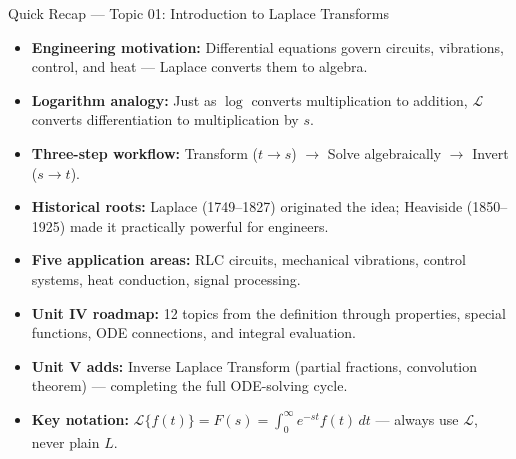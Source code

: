 \documentclass[12pt,a4paper]{article}
\begin{document}
\begin{learnbox}{Quick Recap --- Topic 01: Introduction to Laplace Transforms}
\begin{itemize}[leftmargin=*, itemsep=4pt]
  \item \textbf{Engineering motivation:} Differential equations govern
        circuits, vibrations, control, and heat --- Laplace converts them to
        algebra.
  \item \textbf{Logarithm analogy:} Just as $\log$ converts multiplication to
        addition, $\mathcal{L}$ converts differentiation to multiplication
        by $s$.
  \item \textbf{Three-step workflow:}
        Transform ($t \to s$) $\to$ Solve algebraically $\to$ Invert
        ($s \to t$).
  \item \textbf{Historical roots:} Laplace (1749--1827) originated the idea;
        Heaviside (1850--1925) made it practically powerful for engineers.
  \item \textbf{Five application areas:} RLC circuits, mechanical vibrations,
        control systems, heat conduction, signal processing.
  \item \textbf{Unit IV roadmap:} 12 topics from the definition through
        properties, special functions, ODE connections, and integral
        evaluation.
  \item \textbf{Unit V adds:} Inverse Laplace Transform (partial fractions,
        convolution theorem) --- completing the full ODE-solving cycle.
  \item \textbf{Key notation:}
        $\mathcal{L}\{f(t)\} = F(s) = \int_0^\infty e^{-st}f(t)\,dt$ ---
        always use $\mathcal{L}$, never plain $L$.
\end{itemize}
\end{learnbox}
\end{document}
